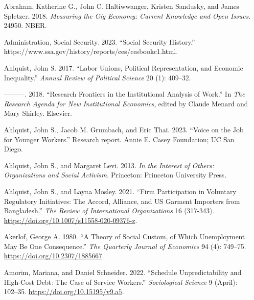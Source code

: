 \documentclass[
  11pt,
  oneside]{article}
\newlength{\cslhangindent}
\newenvironment{CSLReferences}[2] %
 {\begin{list}{}{%
  \setlength{\itemindent}{0pt}
  \setlength{\leftmargin}{0pt}
  \setlength{\parsep}{0pt}
  \ifodd #1
   \setlength{\leftmargin}{\cslhangindent}
   \setlength{\itemindent}{-1\cslhangindent}
  \fi
  \setlength{\itemsep}{#2\baselineskip}}}
 {\end{list}}
\begin{document}
\label{refs}
\begin{CSLReferences}{1}{0}
Abraham, Katherine G., John C. Haltiwwanger, Kristen Sandusky, and James Spletzer. 2018. \emph{Measuring the {Gig} {Economy}: Current Knowledge and Open Issues}. 24950. NBER.

Administration, Social Security. 2023. {``Social {Security History}.''} https://www.ssa.gov/history/reports/ces/cesbookc1.html.

Ahlquist, John S. 2017. {``Labor Unions, Political Representation, and Economic Inequality.''} \emph{Annual Review of Political Science} 20 (1): 409--32.

---------. 2018. {``Research {Frontiers} in the {Institutional} {Analysis} of {Work}.''} In \emph{The {Research} {Agenda} for {New} {Institutional} {Economics}}, edited by Claude Menard and Mary Shirley. Elsevier.

Ahlquist, John S., Jacob M. Grumbach, and Eric Thai. 2023. {``Voice on the Job for Younger Workers.''} Research report. Annie E. Casey Foundation; UC San Diego.

Ahlquist, John S., and Margaret Levi. 2013. \emph{In the {Interest} of {Others}: Organizations and Social Activism}. Princeton: Princeton University Press.

Ahlquist, John S., and Layna Mosley. 2021. {``Firm Participation in Voluntary Regulatory Initiatives: {The} {Accord}, {Alliance}, and {US} Garment Importers from {Bangladesh}.''} \emph{The Review of International Organizations} 16 (317-343). \url{https://doi.org/10.1007/s11558-020-09376-z}.

Akerlof, George A. 1980. {``A {Theory} of {Social} {Custom}, of Which {Unemployment} May Be {One} {Consequence}.''} \emph{The Quarterly Journal of Economics} 94 (4): 749--75. \url{https://doi.org/10.2307/1885667}.

Amorim, Mariana, and Daniel Schneider. 2022. {``Schedule {Unpredictability} and {High}-{Cost} {Debt}: {The} {Case} of {Service} {Workers}.''} \emph{Sociological Science} 9 (April): 102--35. \url{https://doi.org/10.15195/v9.a5}.


\end{CSLReferences}
\end{document}
